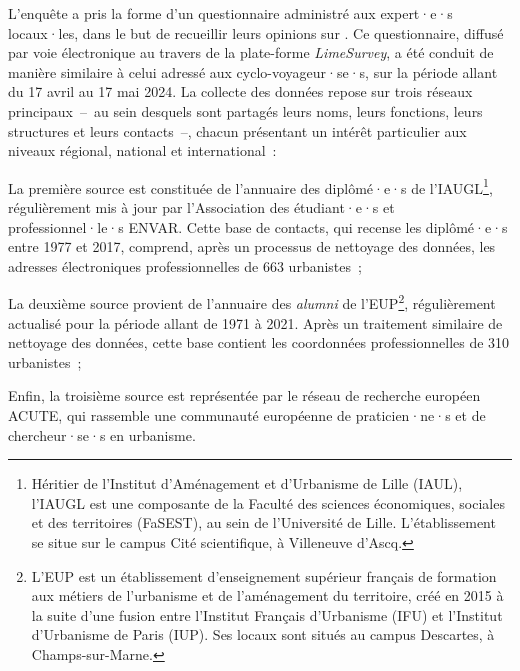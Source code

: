 \begin{refsegment}
L'enquête a pris la forme d'un questionnaire administré aux expert·e·s locaux·les, dans le but de recueillir leurs opinions sur . Ce questionnaire, diffusé par voie électronique au travers de la plate-forme \textsl{LimeSurvey}, a été conduit de manière similaire à celui adressé aux cyclo-voyageur·se·s, sur la période allant du 17 avril au 17 mai 2024. La collecte des données repose sur trois réseaux principaux~–~au sein desquels sont partagés leurs noms, leurs fonctions, leurs structures et leurs contacts~–, chacun présentant un intérêt particulier aux niveaux régional, national et international~:
\begin{customitemize}
    \item La première source est constituée de l'annuaire des diplômé·e·s de l'\acrfull{IAUGL}\footnote{
        Héritier de l'Institut d'Aménagement et d'Urbanisme de Lille (IAUL), l'\acrfull{IAUGL} est une composante de la Faculté des sciences économiques, sociales et des territoires (FaSEST), au sein de l'Université de Lille. L'établissement se situe sur le campus Cité scientifique, à Villeneuve d'Ascq.
    }, régulièrement mis à jour par l'Association des étudiant·e·s et professionnel·le·s \acrfull{ENVAR}. Cette base de contacts, qui recense les diplômé·e·s entre 1977 et 2017, comprend, après un processus de nettoyage des données, les adresses électroniques professionnelles de 663 urbanistes~;
    \item La deuxième source provient de l'annuaire des \textsl{alumni} de l'\acrfull{EUP}\footnote{
        L'\acrfull{EUP} est un établissement d'enseignement supérieur français de formation aux métiers de l'urbanisme et de l'aménagement du territoire, créé en 2015 à la suite d'une fusion entre l'Institut Français d'Urbanisme (IFU) et l'Institut d'Urbanisme de Paris (IUP). Ses locaux sont situés au campus Descartes, à Champs-sur-Marne.
    }, régulièrement actualisé pour la période allant de 1971 à 2021. Après un traitement similaire de nettoyage des données, cette base contient les coordonnées professionnelles de 310 urbanistes~;
    \item Enfin, la troisième source est représentée par le réseau de recherche européen \acrfull{ACUTE}, qui rassemble une communauté européenne de praticien·ne·s et de chercheur·se·s en urbanisme.
\end{customitemize}%


\end{refsegment}
